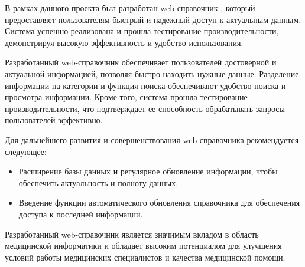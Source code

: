 \conclusion

В рамках данного проекта был разработан web-справочник , который предоставляет пользователям быстрый и надежный доступ к актуальным данным. Система успешно реализована и прошла тестирование производительности, демонстрируя высокую эффективность и удобство использования.

Разработанный web-справочник обеспечивает пользователей достоверной и актуальной информацией, позволяя быстро находить нужные данные. Разделение информации на категории и функция поиска обеспечивают удобство поиска и просмотра информации. Кроме того, система прошла тестирование производительности, что подтверждает ее способность обрабатывать запросы пользователей эффективно.

Для дальнейшего развития и совершенствования web-справочника рекомендуется следующее:
\begin{itemize}
    \item Расширение базы данных и регулярное обновление информации, чтобы обеспечить актуальность и полноту данных.
    \item Введение функции автоматического обновления справочника для обеспечения доступа к последней информации.
\end{itemize}

Разработанный web-справочник является значимым вкладом в область медицинской информатики и обладает высоким потенциалом для улучшения условий работы медицинских специалистов и качества медицинской помощи.